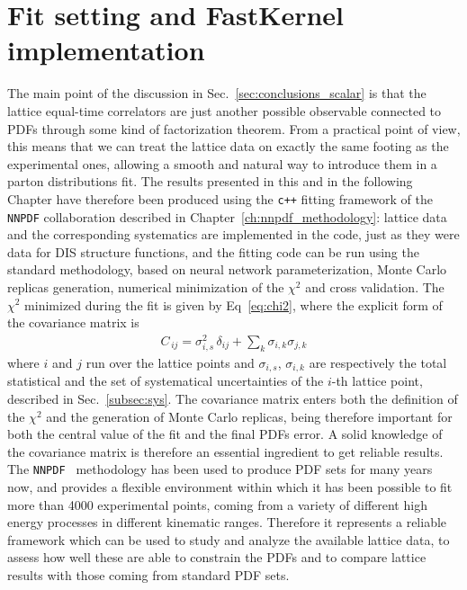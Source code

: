 \section{Fit setting and FastKernel implementation}
\label{sec:fk_qpdf}
The main point of the discussion in Sec.~\ref{sec:conclusions_scalar} is that the lattice equal-time correlators 
are just another possible observable connected to PDFs through some kind of factorization theorem.
From a practical point of view, this means that we can treat the lattice data on
exactly the same footing as the experimental ones, allowing a smooth and natural
way to introduce them in a parton distributions fit. The results presented in this and in the following
Chapter have therefore been produced using the {\tt c++} fitting framework of the {\tt NNPDF} collaboration
described in Chapter~\ref{ch:nnpdf_methodology}: lattice data and the corresponding systematics
are implemented in the code, just as they were data for DIS structure functions, and the fitting code
can be run using the standard methodology, based on neural network parameterization, Monte Carlo replicas generation,
numerical minimization of the $\chi^2$ and cross validation.
The $\chi^2$ minimized during the fit is given by Eq~\eqref{eq:chi2}, where the explicit form of the 
covariance matrix is
\begin{align}
    C_{\,ij} = \sigma_{i,s}^2\, \delta_{ij} + \sum_k \sigma_{i,k} \sigma_{j,k} 
\end{align}
where $i$ and $j$ run over the lattice points and $\sigma_{i,s}$, $\sigma_{i,k}$ 
are respectively the total statistical and the set of  systematical uncertainties
of the $i$-th lattice point, described in Sec.~\ref{subsec:sys}.
The covariance matrix enters both the definition of the $\chi^2$  
and the generation of Monte Carlo replicas,
being therefore important for both the central value of the fit and the final PDFs error. A solid knowledge 
of the covariance matrix is therefore an essential ingredient to get reliable results.
The {\tt NNPDF } methodology has been used to produce PDF sets for many years now, and provides a flexible environment
within which it has been possible to fit more than 4000 experimental points, coming from a variety 
of different high energy processes in different kinematic ranges.
Therefore it represents a reliable framework which can be used to study and analyze the available lattice data, to assess
how well these are able to constrain the PDFs and to compare lattice results with those coming from standard PDF sets.

